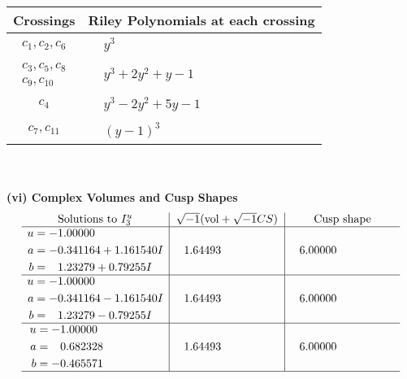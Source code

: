 \documentclass[1p]{elsarticle_modified}
\theoremstyle{definition}
\newcommand{\I}{\sqrt{-1}}
\begin{document}
\begin{tabular}{m{50pt}|m{274pt}}
Crossings & \hspace{64pt}Riley Polynomials at each crossing \\
\hline $$\begin{aligned}c_{1},c_{2},c_{6}\end{aligned}$$&$\begin{aligned}
&y^3
\end{aligned}$\\
\hline $$\begin{aligned}c_{3},c_{5},c_{8}\\c_{9},c_{10}\end{aligned}$$&$\begin{aligned}
&y^3+2 y^2+y-1
\end{aligned}$\\
\hline $$\begin{aligned}c_{4}\end{aligned}$$&$\begin{aligned}
&y^3-2 y^2+5 y-1
\end{aligned}$\\
\hline $$\begin{aligned}c_{7},c_{11}\end{aligned}$$&$\begin{aligned}
&(y-1)^3
\end{aligned}$\\
\hline
\end{tabular}\\~\\
\newpage\flushleft \textbf{(vi) Complex Volumes and Cusp Shapes}
$$\begin{array}{c|c|c}  
\text{Solutions to }I^u_{3}& \I (\text{vol} + \sqrt{-1}CS) & \text{Cusp shape}\\
 \hline 
\begin{aligned}
u &= -1.00000\phantom{ +0.000000I} \\
a &= -0.341164 + 1.161540 I \\
b &= \phantom{-}1.23279 + 0.79255 I\end{aligned}
 & \phantom{-}1.64493\phantom{ +0.000000I} & \phantom{-}6.00000\phantom{ +0.000000I} \\ \hline\begin{aligned}
u &= -1.00000\phantom{ +0.000000I} \\
a &= -0.341164 - 1.161540 I \\
b &= \phantom{-}1.23279 - 0.79255 I\end{aligned}
 & \phantom{-}1.64493\phantom{ +0.000000I} & \phantom{-}6.00000\phantom{ +0.000000I} \\ \hline\begin{aligned}
u &= -1.00000\phantom{ +0.000000I} \\
a &= \phantom{-}0.682328\phantom{ +0.000000I} \\
b &= -0.465571\phantom{ +0.000000I}\end{aligned}
 & \phantom{-}1.64493\phantom{ +0.000000I} & \phantom{-}6.00000\phantom{ +0.000000I}\\
 \hline 
 \end{array}$$\newpage
\end{document}
